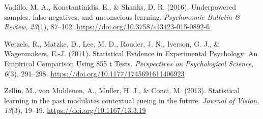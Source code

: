 \documentclass[
  man,
  floatsintext,
  longtable,
  nolmodern,
  notxfonts,
  notimes,
  colorlinks=true,linkcolor=blue,citecolor=blue,urlcolor=blue]{apa7}
\newlength{\cslhangindent}
\newenvironment{CSLReferences}[2] %
 {\begin{list}{}{%
  \setlength{\itemindent}{0pt}
  \setlength{\leftmargin}{0pt}
  \setlength{\parsep}{0pt}
  \ifodd #1
   \setlength{\leftmargin}{\cslhangindent}
   \setlength{\itemindent}{-1\cslhangindent}
  \fi
  \setlength{\itemsep}{#2\baselineskip}}}
 {\end{list}}
\begin{document}
\begin{CSLReferences}{1}{0}
Vadillo, M. A., Konstantinidis, E., \& Shanks, D. R. (2016).
Underpowered samples, false negatives, and unconscious learning.
\emph{Psychonomic Bulletin \& Review}, \emph{23}(1), 87--102.
\url{https://doi.org/10.3758/s13423-015-0892-6}

Wetzels, R., Matzke, D., Lee, M. D., Rouder, J. N., Iverson, G. J., \&
Wagenmakers, E.-J. (2011). Statistical {Evidence} in {Experimental
Psychology}: {An Empirical Comparison Using} 855 t {Tests}.
\emph{Perspectives on Psychological Science}, \emph{6}(3), 291--298.
\url{https://doi.org/10.1177/1745691611406923}

Zellin, M., von Muhlenen, A., Muller, H. J., \& Conci, M. (2013).
Statistical learning in the past modulates contextual cueing in the
future. \emph{Journal of Vision}, \emph{13}(3), 19--19.
\url{https://doi.org/10.1167/13.3.19}

\end{CSLReferences}
\end{document}
